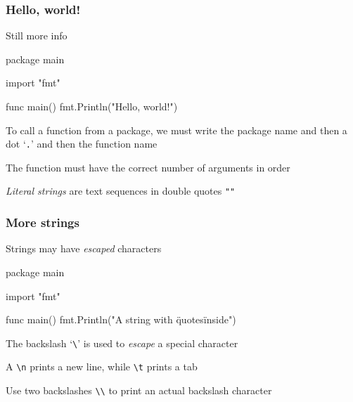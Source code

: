\documentclass[handout,compress,t,11pt]{beamer}
\begin{document}

\begin{frame}[fragile]
\frametitle{Hello, world!}
Still more info
\begin{golang}
package main

import "fmt"

func main() {
    fmt.Println("Hello, world!")
}
\end{golang}
    \vspace{0.5\baselineskip}
To call a function from a package, we must write the package name
and then a dot `\verb|.|' and then the function name \par
    \vspace{0.5\baselineskip}
The function must have the correct number of arguments in order \par
    \vspace{0.5\baselineskip}
{\em Literal strings} are text sequences in double quotes \verb|""|
\end{frame}

\begin{frame}[fragile]
\frametitle{More strings}
Strings may have {\em escaped} characters
\begin{golang}
package main

import "fmt"

func main() {
    fmt.Println("A string with \"quotes\" inside")
}
\end{golang}
    \vspace{1.5\baselineskip}
The backslash `\verb|\|' is used to {\em escape} a special character \par
    \vspace{0.5\baselineskip}
A \verb|\n| prints a new line, while \verb|\t| prints a tab \par
    \vspace{0.5\baselineskip}
Use two backslashes \verb|\\| to print an actual backslash character
\end{frame}
\end{document}
